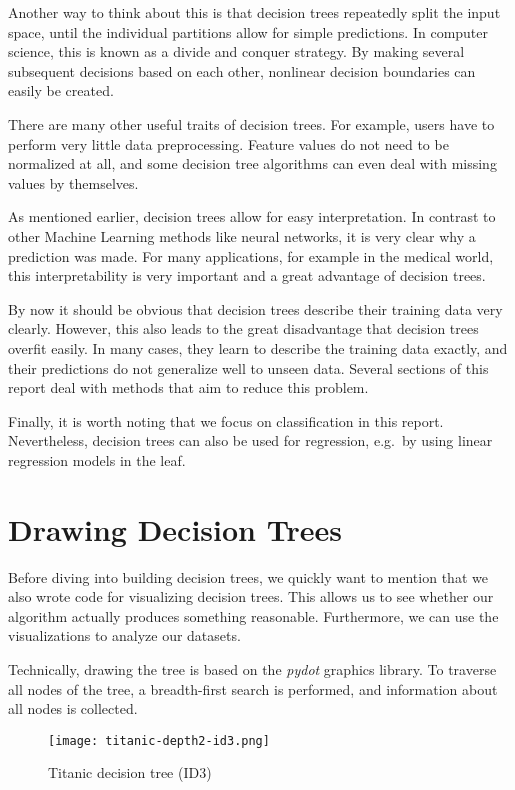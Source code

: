\documentclass[a4paper]{article}
\begin{document}
Another way to think about this is that decision trees repeatedly split the input space, until the individual partitions allow for simple predictions. In computer science, this is known as a divide and conquer strategy. By making several subsequent decisions based on each other, nonlinear decision boundaries can easily be created.

There are many other useful traits of decision trees. For example, users have to perform very little data preprocessing. Feature values do not need to be normalized at all, and some decision tree algorithms can even deal with missing values by themselves.

As mentioned earlier, decision trees allow for easy interpretation. In contrast to other Machine Learning methods like neural networks, it is very clear why a prediction was made. For many applications, for example in the medical world, this interpretability is very important and a great advantage of decision trees.

By now it should be obvious that decision trees describe their training data very clearly. However, this also leads to the great disadvantage that decision trees overfit easily. In many cases, they learn to describe the training data exactly, and their predictions do not generalize well to unseen data. Several sections of this report deal with methods that aim to reduce this problem.

Finally, it is worth noting that we focus on classification in this report. Nevertheless, decision trees can also be used for regression, e.g.\ by using linear regression models in the leaf.

\section{Drawing Decision Trees}

Before diving into building decision trees, we quickly want to mention that we also wrote code for visualizing decision trees. This allows us to see whether our algorithm actually produces something reasonable. Furthermore, we can use the visualizations to analyze our datasets.

Technically, drawing the tree is based on the \emph{pydot} graphics library. To traverse all nodes of the tree, a breadth-first search is performed, and information about all nodes is collected.

\begin{figure}[h]
	\texttt{[image: titanic-depth2-id3.png]}
    \caption{Titanic decision tree (ID3)}
    \label{fig:drawing-titanic}
\end{figure}
\end{document}
